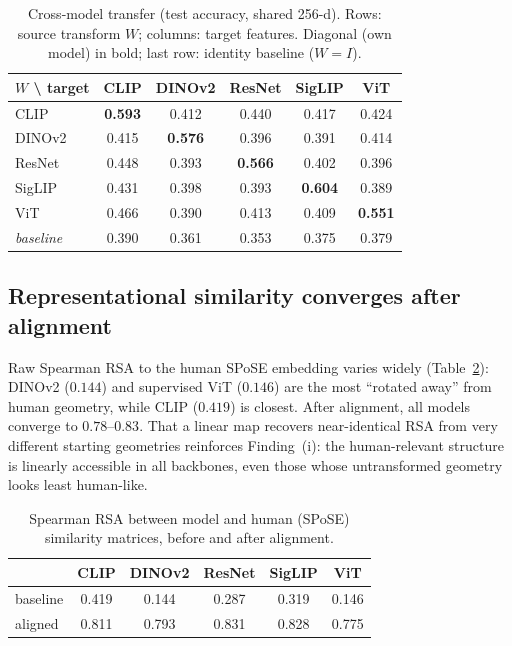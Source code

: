 \documentclass{article}
\begin{document}
\begin{table}[t]
\centering
\caption{Cross-model transfer (test accuracy, shared 256-d). Rows: source
transform $W$; columns: target features. Diagonal (own model) in bold; last row:
identity baseline ($W{=}I$).}
\label{tab:transfer}
\begin{tabular}{lccccc}
\toprule
$W$ \textbackslash{} target & CLIP & DINOv2 & ResNet & SigLIP & ViT \\
\midrule
CLIP    & \textbf{0.593} & 0.412 & 0.440 & 0.417 & 0.424 \\
DINOv2  & 0.415 & \textbf{0.576} & 0.396 & 0.391 & 0.414 \\
ResNet  & 0.448 & 0.393 & \textbf{0.566} & 0.402 & 0.396 \\
SigLIP  & 0.431 & 0.398 & 0.393 & \textbf{0.604} & 0.389 \\
ViT     & 0.466 & 0.390 & 0.413 & 0.409 & \textbf{0.551} \\
\midrule
\textit{baseline} & 0.390 & 0.361 & 0.353 & 0.375 & 0.379 \\
\bottomrule
\end{tabular}
\end{table}

\subsection{Representational similarity converges after alignment}
Raw Spearman RSA to the human SPoSE embedding varies widely
(Table~\ref{tab:rsa}): DINOv2 ($0.144$) and supervised ViT ($0.146$) are the most
``rotated away'' from human geometry, while CLIP ($0.419$) is closest. After
alignment, all models converge to $0.78$--$0.83$. That a linear map recovers
near-identical RSA from very different starting geometries reinforces
Finding~(i): the human-relevant structure is linearly accessible in all
backbones, even those whose untransformed geometry looks least human-like.

\begin{table}[t]
\centering
\caption{Spearman RSA between model and human (SPoSE) similarity matrices, before
and after alignment.}
\label{tab:rsa}
\begin{tabular}{lccccc}
\toprule
 & CLIP & DINOv2 & ResNet & SigLIP & ViT \\
\midrule
baseline & 0.419 & 0.144 & 0.287 & 0.319 & 0.146 \\
aligned  & 0.811 & 0.793 & 0.831 & 0.828 & 0.775 \\
\bottomrule
\end{tabular}
\end{table}
\end{document}
